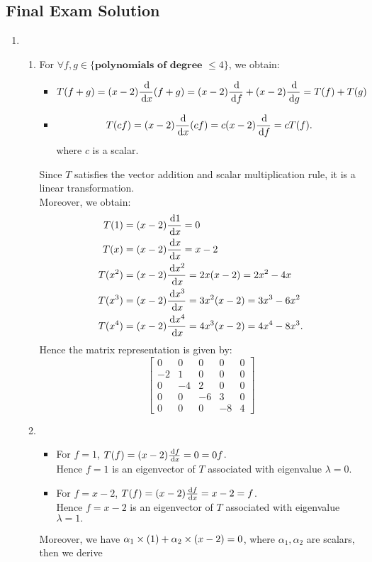 \subsection{Final Exam Solution}
\begin{enumerate}
\item
\begin{enumerate}
\item
For $\forall f,g\in\{\textbf{polynomials of degree $\le4$}\}$, we obtain:
\begin{itemize}
\item
\[
T(f+g)=(x-2)\frac{\,\mathrm{d}}{\,\mathrm{d} x}(f+g)=(x-2)\frac{\,\mathrm{d}}{\,\mathrm{d} f}+(x-2)\frac{\,\mathrm{d}}{\,\mathrm{d} g}
=T(f)+T(g)
\]
\item
\[
T(cf)=(x-2)\frac{\,\mathrm{d}}{\,\mathrm{d} x}(cf)=c(x-2)\frac{\,\mathrm{d}}{\,\mathrm{d} f}
=cT(f).
\]
where $c$ is a scalar.
\end{itemize}
Since $T$ satisfies the vector addition and scalar multiplication rule, it is a linear transformation.\\
Moreover, we obtain:
\begin{align*}
T(1)&=(x-2)\frac{\,\mathrm{d} 1}{\,\mathrm{d} x}=0\\
T(x)&=(x-2)\frac{\,\mathrm{d} x}{\,\mathrm{d} x}=x-2\\
T(x^2)&=(x-2)\frac{\,\mathrm{d} x^2}{\,\mathrm{d} x}=2x(x-2)=2x^2-4x\\
T(x^3)&=(x-2)\frac{\,\mathrm{d} x^3}{\,\mathrm{d} x}=3x^2(x-2)=3x^3-6x^2\\
T(x^4)&=(x-2)\frac{\,\mathrm{d} x^4}{\,\mathrm{d} x}=4x^3(x-2)=4x^4-8x^3.
\end{align*}
Hence the matrix representation is given by:
\[
\begin{bmatrix}
0&0&0&0&0\\
-2&1&0&0&0\\
0&-4&2&0&0\\
0&0&-6&3&0\\
0&0&0&-8&4
\end{bmatrix}
\]
\item
\begin{itemize}
\item
For $f=1$, $T(f)=(x-2)\frac{\,\mathrm{d} f}{\,\mathrm{d} x}=0=0f$.\\
Hence $f=1$ is an eigenvector of $T$ associated with eigenvalue $\lambda=0.$
\item
For $f=x-2$, $T(f)=(x-2)\frac{\,\mathrm{d} f}{\,\mathrm{d} x}=x-2=f$.\\
Hence $f=x-2$ is an eigenvector of $T$ associated with eigenvalue $\lambda=1.$
\end{itemize}
Moreover, we have $\alpha_1\times(1)+\alpha_2\times(x-2)=0$, where $\alpha_1,\alpha_2$ are scalars, then we derive

\end{enumerate}
\end{enumerate}
